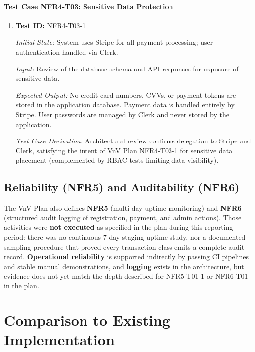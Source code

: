 \documentclass[12pt, titlepage]{article}
\begin{document}
\paragraph{Test Case NFR4-T03: Sensitive Data Protection}

\begin{enumerate}

\item \textbf{Test ID:} NFR4-T03-1

\textit{Initial State:} System uses Stripe for all payment processing; user authentication handled via Clerk.

\textit{Input:} Review of the database schema and API responses for exposure of sensitive data.

\textit{Expected Output:} No credit card numbers, CVVs, or payment tokens are stored in the application database. Payment data is handled entirely by Stripe. User passwords are managed by Clerk and never stored by the application.

\textit{Test Case Derivation:} Architectural review confirms delegation to Stripe and Clerk, satisfying the intent of VnV Plan NFR4-T03-1 for sensitive data placement (complemented by RBAC tests limiting data visibility).

\end{enumerate}


\subsection{Reliability (NFR5) and Auditability (NFR6)}

The VnV Plan also defines \textbf{NFR5} (multi-day uptime monitoring) and \textbf{NFR6} (structured audit logging of registration, payment, and admin actions). Those activities were \textbf{not executed} as specified in the plan during this reporting period: there was no continuous 7-day staging uptime study, nor a documented sampling procedure that proved every transaction class emits a complete audit record. \textbf{Operational reliability} is supported indirectly by passing CI pipelines and stable manual demonstrations, and \textbf{logging} exists in the architecture, but evidence does not yet match the depth described for NFR5-T01-1 or NFR6-T01 in the plan.

\section{Comparison to Existing Implementation}
\end{document}
